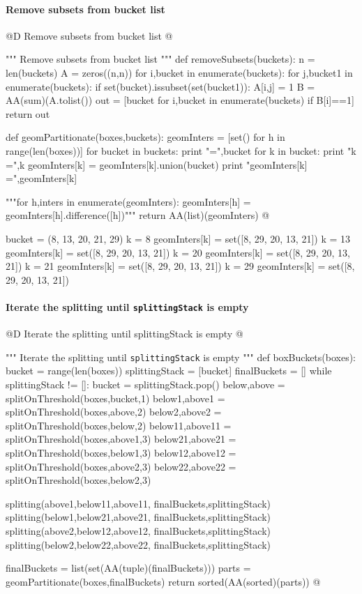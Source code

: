 \documentclass[11pt,oneside]{article}    %
\begin{document}
\paragraph{Remove subsets from bucket list}
@D Remove subsets from bucket list @{
""" Remove subsets from bucket list """
def removeSubsets(buckets):
    n = len(buckets)
    A = zeros((n,n))
    for i,bucket in enumerate(buckets):
        for j,bucket1 in enumerate(buckets):
            if set(bucket).issubset(set(bucket1)):
                A[i,j] = 1
    B = AA(sum)(A.tolist())
    out = [bucket for i,bucket in enumerate(buckets) if B[i]==1]
    return out

def geomPartitionate(boxes,buckets):
    geomInters = [set() for h in range(len(boxes))]
    for bucket in buckets:
        print "\nbucket =",bucket
        for k in bucket:
            print "k =",k
            geomInters[k] = geomInters[k].union(bucket)
            print "geomInters[k] =",geomInters[k]

    """for h,inters in enumerate(geomInters):
        geomInters[h] = geomInters[h].difference([h])"""
    return AA(list)(geomInters)
@}
    
bucket = (8, 13, 20, 21, 29)
k = 8
geomInters[k] = set([8, 29, 20, 13, 21])
k = 13
geomInters[k] = set([8, 29, 20, 13, 21])
k = 20
geomInters[k] = set([8, 29, 20, 13, 21])
k = 21
geomInters[k] = set([8, 29, 20, 13, 21])
k = 29
geomInters[k] = set([8, 29, 20, 13, 21])


\paragraph{Iterate the splitting until \texttt{splittingStack} is empty}
@D Iterate the splitting until splittingStack is empty
@{""" Iterate the splitting until \texttt{splittingStack} is empty """
def boxBuckets(boxes):
    bucket = range(len(boxes))
    splittingStack = [bucket]
    finalBuckets = []
    while splittingStack != []:
        bucket = splittingStack.pop()
        below,above = splitOnThreshold(boxes,bucket,1)
        below1,above1 = splitOnThreshold(boxes,above,2)
        below2,above2 = splitOnThreshold(boxes,below,2)        
        below11,above11 = splitOnThreshold(boxes,above1,3)
        below21,above21 = splitOnThreshold(boxes,below1,3)        
        below12,above12 = splitOnThreshold(boxes,above2,3)
        below22,above22 = splitOnThreshold(boxes,below2,3)  
              
        splitting(above1,below11,above11, finalBuckets,splittingStack)
        splitting(below1,below21,above21, finalBuckets,splittingStack)
        splitting(above2,below12,above12, finalBuckets,splittingStack)
        splitting(below2,below22,above22, finalBuckets,splittingStack)
        
        finalBuckets = list(set(AA(tuple)(finalBuckets)))
    parts = geomPartitionate(boxes,finalBuckets)
    return sorted(AA(sorted)(parts))
@}
\end{document}
